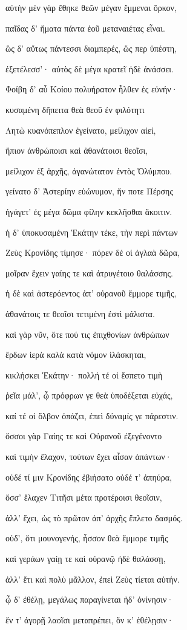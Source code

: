\begin{pages}
\begin{Leftside}
αὐτὴν μὲν γὰρ ἔθηκε θεῶν μέγαν ἔμμεναι ὅρκον, 

παῖδας δ' ἤματα πάντα ἑοῦ μεταναιέτας εἶναι.

ὣς δ' αὔτως πάντεσσι διαμπερές, ὥς περ ὑπέστη,

ἐξετέλεσσ'· αὐτὸς δὲ μέγα κρατεῖ ἠδὲ ἀνάσσει. 

Φοίβη δ' αὖ Κοίου πολυήρατον ἦλθεν ἐς εὐνήν· 

κυσαμένη δἤπειτα θεὰ θεοῦ ἐν φιλότητι  

Λητὼ κυανόπεπλον ἐγείνατο, μείλιχον αἰεί,

ἤπιον ἀνθρώποισι καὶ ἀθανάτοισι θεοῖσι, 

μείλιχον ἐξ ἀρχῆς, ἀγανώτατον ἐντὸς Ὀλύμπου.

γείνατο δ' Ἀστερίην εὐώνυμον, ἥν ποτε Πέρσης

ἠγάγετ' ἐς μέγα δῶμα φίλην κεκλῆσθαι ἄκοιτιν. 

ἡ δ' ὑποκυσαμένη Ἑκάτην τέκε, τὴν περὶ πάντων 

Ζεὺς Κρονίδης τίμησε· πόρεν δέ οἱ ἀγλαὰ δῶρα, 

μοῖραν ἔχειν γαίης τε καὶ ἀτρυγέτοιο θαλάσσης.

ἡ δὲ καὶ ἀστερόεντος ἀπ' οὐρανοῦ ἔμμορε τιμῆς, 

ἀθανάτοις τε θεοῖσι τετιμένη ἐστὶ μάλιστα. 

καὶ γὰρ νῦν, ὅτε πού τις ἐπιχθονίων ἀνθρώπων

ἔρδων ἱερὰ καλὰ κατὰ νόμον ἱλάσκηται,

κικλήσκει Ἑκάτην· πολλή τέ οἱ ἔσπετο τιμὴ 

ῥεῖα μάλ', ᾧ πρόφρων γε θεὰ ὑποδέξεται εὐχάς,

καί τέ οἱ ὄλβον ὀπάζει, ἐπεὶ δύναμίς γε πάρεστιν. 

ὅσσοι γὰρ Γαίης τε καὶ Οὐρανοῦ ἐξεγένοντο

καὶ τιμὴν ἔλαχον, τούτων ἔχει αἶσαν ἁπάντων· 

οὐδέ τί μιν Κρονίδης ἐβιήσατο οὐδέ τ' ἀπηύρα,

ὅσσ' ἔλαχεν Τιτῆσι μέτα προτέροισι θεοῖσιν, 

ἀλλ' ἔχει, ὡς τὸ πρῶτον ἀπ' ἀρχῆς ἔπλετο δασμός.  

οὐδ', ὅτι μουνογενής, ἧσσον θεὰ ἔμμορε τιμῆς 

καὶ γεράων γαίῃ τε καὶ οὐρανῷ ἠδὲ θαλάσσῃ, 

ἀλλ' ἔτι καὶ πολὺ μᾶλλον, ἐπεὶ Ζεὺς τίεται αὐτήν.

ᾧ δ' ἐθέλῃ, μεγάλως παραγίνεται ἠδ' ὀνίνησιν· 

ἔν τ' ἀγορῇ λαοῖσι μεταπρέπει, ὅν κ' ἐθέλῃσιν·  


\end{Leftside}
\end{pages}

